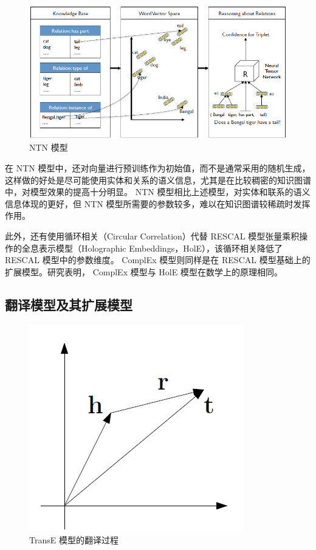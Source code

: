 \documentclass{llncs}
\begin{document}
\begin{figure}
	\centering
	\includegraphics[width=0.8\columnwidth]{figures/NTN.png}
	\caption{ NTN 模型}
	\label{fg:NTN}
\end{figure}
在 NTN 模型中，还对向量进行预训练作为初始值，而不是通常采用的随机生成，这样做的好处是尽可能使用实体和关系的语义信息，尤其是在比较稠密的知识图谱中，对模型效果的提高十分明显。 NTN 模型相比上述模型，对实体和联系的语义信息体现的更好，但 NTN 模型所需要的参数较多，难以在知识图谱较稀疏时发挥作用。

此外，还有使用循环相关（Circular Correlation）代替 RESCAL 模型张量乘积操作的全息表示模型（Holographic Embeddings，HolE）\cite{DBLP:conf/aaai/NickelRP16}，该循环相关降低了 RESCAL 模型中的参数维度。 ComplEx 模型\cite{DBLP:conf/icml/TrouillonWRGB16}则同样是在 RESCAL 模型基础上的扩展模型。研究\cite{DBLP:conf/acl/HayashiS17}表明， ComplEx 模型与 HolE 模型在数学上的原理相同。

\subsection{翻译模型及其扩展模型}

\begin{figure}
	\centering
	\includegraphics[width=0.5\columnwidth]{figures/TransE.png}
	\caption{ TransE 模型的翻译过程}
	\label{fg:TransE}
\end{figure}
\end{document}
